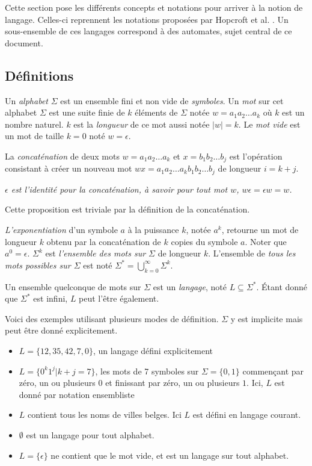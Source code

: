 Cette section pose les différents concepts et notations pour arriver à la notion de langage. Celles-ci reprennent les notations proposées par Hopcroft et al. \cite{Hopcroft00}. Un sous-ensemble de ces langages correspond à des automates, sujet central de ce document.

\subsection{Définitions}

Un \emph{alphabet} $\Sigma$ est un ensemble fini et non vide de \emph{symboles}. Un \emph{mot} sur cet alphabet $\Sigma$ est une suite finie de $k$ éléments de $\Sigma$ notée $ w = a_1a_2\dots a_k$ où $k$ est un nombre naturel. $k$ est la \emph{longueur} de ce mot aussi notée $|w|=k$. Le \emph{mot vide} est un mot de taille $k=0$ noté $w=\epsilon$.

La \emph{concaténation} de deux mots $w=a_1a_2\dots a_k$ et $x=b_1b_2\dots b_j$ est l'opération consistant à créer un nouveau mot $wx=a_1a_2\dots a_kb_1b_2\dots b_j$ de longueur $i=k+j$.

\begin{proposition}\emph{
$\epsilon$ est \emph{l'identité pour la concaténation}, à savoir pour tout mot $w$, $w\epsilon = \epsilon w = w$.}
\end{proposition}

Cette proposition est triviale par la définition de la concaténation.

\emph{L'exponentiation} d'un symbole $a$ à la puissance $k$, notée $a^k$, retourne un mot de longueur $k$ obtenu par la concaténation de $k$ copies du symbole $a$. Noter que $a^0=\epsilon$. $\Sigma^k$ est \emph{l'ensemble des mots sur $\Sigma$} de longueur $k$. L'ensemble de \emph{tous les mots possibles sur $\Sigma$} est noté $\Sigma^* = \bigcup_{k=0}^{\infty}\Sigma^k$.


Un ensemble quelconque de mots sur $\Sigma$ est un \emph{langage}, noté $L \subseteq \Sigma^*$. Étant donné que $\Sigma^*$ est infini, $L$ peut l'être également.

\begin{example} Voici des exemples utilisant plusieurs modes de définition. $\Sigma$ y est implicite mais peut être donné explicitement.
	\begin{itemize}
		\item $L=\{12,35,42,7,0\}$, un langage défini explicitement
		\item $L=\{0^k1^j|k+j=7\}$, les mots de 7 symboles sur $\Sigma=\{0,1\}$ commençant par zéro, un ou plusieurs $0$ et finissant par zéro, un ou plusieurs $1$. Ici, $L$ est donné par notation ensembliste
		\item $L$ contient tous les noms de villes belges. Ici $L$ est défini en langage courant.
		\item $\emptyset$ est un langage pour tout alphabet.
		\item $L=\{\epsilon\}$ ne contient que le mot vide, et est un langage sur tout alphabet.
	\end{itemize}
\end{example}


